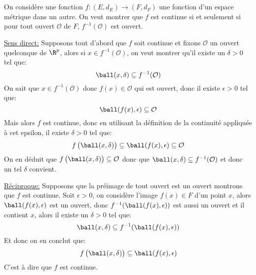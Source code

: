 \documentclass{report}
\begin{document}
   \chapter*{}
      \subsection*{}
      On considère une fonction \(f : (E, d_E) \longrightarrow (F, d_F)\) une fonction d'un espace métrique dans un autre. On veut montrer que \(f\) est continue si et seulement si pour tout ouvert \(\mathcal{O}\) de \(F\), \(f^{-1}(\mathcal{O})\) est ouvert.\<

      \underline{Sens direct:} Supposons tout d'abord que \(f\) soit continue et fixons \(\mathcal{O}\) un ouvert quelconque de \(\R^p\), alors si \(x \in f^{-1}(\mathcal{O})\), on veut montrer qu'il existe un \(\delta > 0\) tel que:
      \[
         \ball(x, \delta) \subseteq f^{-1}(\mathcal{O})   
      \]
      On sait que \(x \in f^{-1}(\mathcal{O})\) donc \(f(x) \in \mathcal{O}\) qui est ouvert, donc il existe \(\epsilon > 0\) tel que:
      \[
         \ball(f(x), \epsilon) \subseteq \mathcal{O}        
      \]
      Mais alors \(f\) est continue, donc en utilisant la définition de la continuité appliquée à cet epsilon, il existe \(\delta > 0\) tel que:
      \[
         f\left(\ball(x, \delta)\right) \subseteq \ball(f(x), \epsilon) \subseteq \mathcal{O} 
      \]
      On en déduit que \(f\left(\ball(x, \delta)\right) \subseteq \mathcal{O}\) donc que \(\ball(x, \delta) \subseteq f^{-1}(\mathcal{O})\) et donc un tel \(\delta\) convient.\<

      \underline{Réciproque:} Supposons que la préimage de tout ouvert est un ouvert montrons que \(f\) est continue. Soit \(\epsilon > 0\), on considère l'image \(f(x) \in F\) d'un point \(x\), alors \(\ball(f(x), \epsilon)\) est un ouvert, donc \(f^{-1}(\ball(f(x), \epsilon))\) est aussi un ouvert et il contient \(x\), alors il existe un \(\delta > 0\) tel que:
      \[
         \ball(x, \delta) \subseteq f^{-1}(\ball(f(x), \epsilon))
      \] 
      Et donc on en conclut que:
      \[
         f\left(\ball(x, \delta)\right) \subseteq \ball(f(x), \epsilon)
      \]
      C'est à dire que \(f\) est continue.
\end{document}
